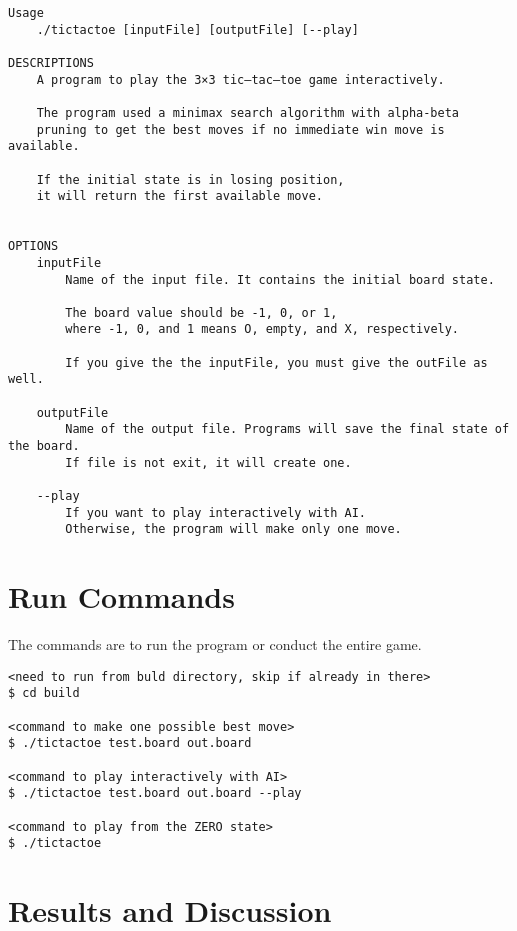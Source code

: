 \documentclass[twoside,10pt]{article}
\begin{document}
\begin{tcolorbox}[boxrule=0pt]
    \begin{verbatim}
Usage
    ./tictactoe [inputFile] [outputFile] [--play]

DESCRIPTIONS
    A program to play the 3×3 tic–tac–toe game interactively.

    The program used a minimax search algorithm with alpha-beta
    pruning to get the best moves if no immediate win move is available.

    If the initial state is in losing position,
    it will return the first available move.


OPTIONS
    inputFile
        Name of the input file. It contains the initial board state.

        The board value should be -1, 0, or 1,
        where -1, 0, and 1 means O, empty, and X, respectively.

        If you give the the inputFile, you must give the outFile as well.

    outputFile
        Name of the output file. Programs will save the final state of the board.
        If file is not exit, it will create one.

    --play
        If you want to play interactively with AI.
        Otherwise, the program will make only one move.
\end{verbatim}
\end{tcolorbox}

\section*{Run Commands}

The commands are to run the program or conduct the entire game.

\begin{tcolorbox}[boxrule=0pt]
    \begin{verbatim}
<need to run from buld directory, skip if already in there>
$ cd build

<command to make one possible best move>
$ ./tictactoe test.board out.board

<command to play interactively with AI>
$ ./tictactoe test.board out.board --play

<command to play from the ZERO state>
$ ./tictactoe
\end{verbatim}
\end{tcolorbox}

\section*{Results and Discussion}
\end{document}
